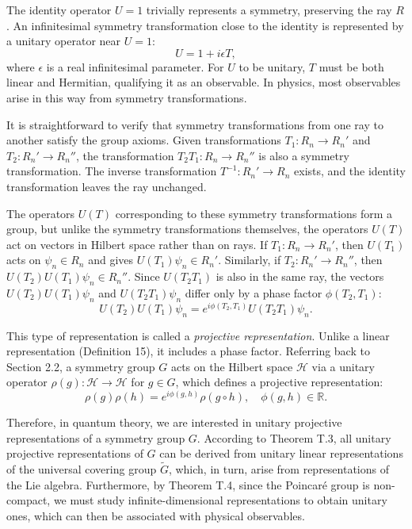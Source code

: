 The identity operator $U = 1$ trivially represents a symmetry, preserving the ray $R$. An infinitesimal symmetry transformation close to the identity is represented by a unitary operator near $U = 1$:
\[
U = 1 + i \epsilon T,
\]
where $\epsilon$ is a real infinitesimal parameter. For $U$ to be unitary, $T$ must be both linear and Hermitian, qualifying it as an observable. In physics, most observables arise in this way from symmetry transformations.

It is straightforward to verify that symmetry transformations from one ray to another satisfy the group axioms. Given transformations $T_1 : R_n \to R_n'$ and $T_2 : R_n' \to R_n''$, the transformation $T_2 T_1 : R_n \to R_n''$ is also a symmetry transformation. The inverse transformation $T^{-1} : R_n' \to R_n$ exists, and the identity transformation leaves the ray unchanged.

The operators $U(T)$ corresponding to these symmetry transformations form a group, but unlike the symmetry transformations themselves, the operators $U(T)$ act on vectors in Hilbert space rather than on rays. If $T_1 : R_n \to R_n'$, then $U(T_1)$ acts on $\psi_n \in R_n$ and gives $U(T_1) \psi_n \in R_n'$. Similarly, if $T_2 : R_n' \to R_n''$, then $U(T_2)U(T_1) \psi_n \in R_n''$. Since $U(T_2 T_1)$ is also in the same ray, the vectors $U(T_2) U(T_1) \psi_n$ and $U(T_2 T_1) \psi_n$ differ only by a phase factor $\phi(T_2, T_1)$:
\[
U(T_2) U(T_1) \psi_n = e^{i \phi(T_2, T_1)} U(T_2 T_1) \psi_n.
\]

This type of representation is called a \emph{projective representation}. Unlike a linear representation (Definition 15), it includes a phase factor. Referring back to Section 2.2, a symmetry group $G$ acts on the Hilbert space $\mathcal{H}$ via a unitary operator $\rho(g) : \mathcal{H} \to \mathcal{H}$ for $g \in G$, which defines a projective representation:
\[
\rho(g) \rho(h) = e^{i \phi(g, h)} \rho(g \circ h), \quad \phi(g, h) \in \mathbb{R}.
\]

Therefore, in quantum theory, we are interested in unitary projective representations of a symmetry group $G$. According to Theorem T.3, all unitary projective representations of $G$ can be derived from unitary linear representations of the universal covering group $\tilde{G}$, which, in turn, arise from representations of the Lie algebra. Furthermore, by Theorem T.4, since the Poincaré group is non-compact, we must study infinite-dimensional representations to obtain unitary ones, which can then be associated with physical observables.

